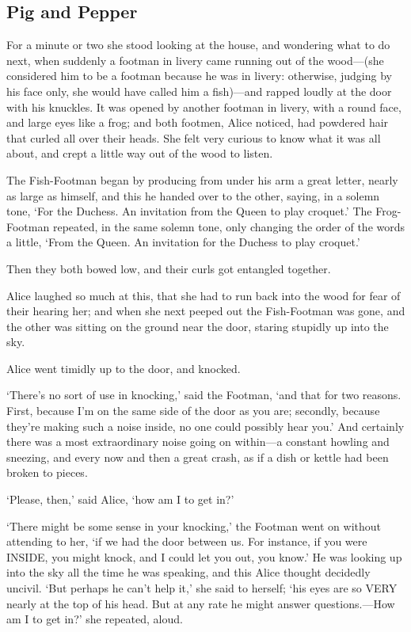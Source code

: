 \documentclass[12pt]{article}
\begin{document}
\begin{Parallel}[p]{}{}
{\section{Pig and Pepper}

For a minute or two she stood looking at the house, and wondering what to do next, when suddenly a footman in livery came running out of the wood—(she considered him to be a footman because he was in livery: otherwise, judging by his face only, she would have called him a fish)—and rapped loudly at the door with his knuckles. It was opened by another footman in livery, with a round face, and large eyes like a frog; and both footmen, Alice noticed, had powdered hair that curled all over their heads. She felt very curious to know what it was all about, and crept a little way out of the wood to listen.

The Fish-Footman began by producing from under his arm a great letter, nearly as large as himself, and this he handed over to the other, saying, in a solemn tone, ‘For the Duchess. An invitation from the Queen to play croquet.’ The Frog-Footman repeated, in the same solemn tone, only changing the order of the words a little, ‘From the Queen. An invitation for the Duchess to play croquet.’

Then they both bowed low, and their curls got entangled together.

Alice laughed so much at this, that she had to run back into the wood for fear of their hearing her; and when she next peeped out the Fish-Footman was gone, and the other was sitting on the ground near the door, staring stupidly up into the sky.

Alice went timidly up to the door, and knocked.

‘There’s no sort of use in knocking,’ said the Footman, ‘and that for two reasons. First, because I’m on the same side of the door as you are; secondly, because they’re making such a noise inside, no one could possibly hear you.’ And certainly there was a most extraordinary noise going on within—a constant howling and sneezing, and every now and then a great crash, as if a dish or kettle had been broken to pieces.

‘Please, then,’ said Alice, ‘how am I to get in?’

‘There might be some sense in your knocking,’ the Footman went on without attending to her, ‘if we had the door between us. For instance, if you were INSIDE, you might knock, and I could let you out, you know.’ He was looking up into the sky all the time he was speaking, and this Alice thought decidedly uncivil. ‘But perhaps he can’t help it,’ she said to herself; ‘his eyes are so VERY nearly at the top of his head. But at any rate he might answer questions.—How am I to get in?’ she repeated, aloud.

}
\end{Parallel}
\end{document}
